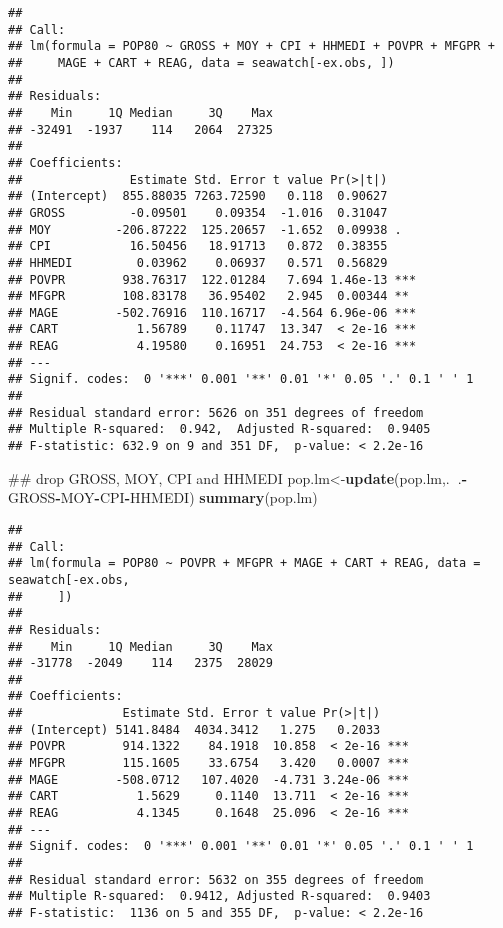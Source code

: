 \documentclass[]{article}
\newenvironment{Shaded}{\begin{snugshade}}{\end{snugshade}}
\newcommand{\KeywordTok}[1]{\textcolor[rgb]{0.13,0.29,0.53}{\textbf{#1}}}
\newcommand{\OperatorTok}[1]{\textcolor[rgb]{0.81,0.36,0.00}{\textbf{#1}}}
\newcommand{\NormalTok}[1]{#1}
\begin{document}
\begin{verbatim}
## 
## Call:
## lm(formula = POP80 ~ GROSS + MOY + CPI + HHMEDI + POVPR + MFGPR + 
##     MAGE + CART + REAG, data = seawatch[-ex.obs, ])
## 
## Residuals:
##    Min     1Q Median     3Q    Max 
## -32491  -1937    114   2064  27325 
## 
## Coefficients:
##               Estimate Std. Error t value Pr(>|t|)    
## (Intercept)  855.88035 7263.72590   0.118  0.90627    
## GROSS         -0.09501    0.09354  -1.016  0.31047    
## MOY         -206.87222  125.20657  -1.652  0.09938 .  
## CPI           16.50456   18.91713   0.872  0.38355    
## HHMEDI         0.03962    0.06937   0.571  0.56829    
## POVPR        938.76317  122.01284   7.694 1.46e-13 ***
## MFGPR        108.83178   36.95402   2.945  0.00344 ** 
## MAGE        -502.76916  110.16717  -4.564 6.96e-06 ***
## CART           1.56789    0.11747  13.347  < 2e-16 ***
## REAG           4.19580    0.16951  24.753  < 2e-16 ***
## ---
## Signif. codes:  0 '***' 0.001 '**' 0.01 '*' 0.05 '.' 0.1 ' ' 1
## 
## Residual standard error: 5626 on 351 degrees of freedom
## Multiple R-squared:  0.942,  Adjusted R-squared:  0.9405 
## F-statistic: 632.9 on 9 and 351 DF,  p-value: < 2.2e-16
\end{verbatim}

\begin{Shaded}
\begin{Highlighting}[]
\NormalTok{## drop GROSS, MOY, CPI and HHMEDI}
\NormalTok{pop.lm<-}\KeywordTok{update}\NormalTok{(pop.lm,.}\OperatorTok{~}\NormalTok{.}\OperatorTok{-}\NormalTok{GROSS}\OperatorTok{-}\NormalTok{MOY}\OperatorTok{-}\NormalTok{CPI}\OperatorTok{-}\NormalTok{HHMEDI)}
\KeywordTok{summary}\NormalTok{(pop.lm)}
\end{Highlighting}
\end{Shaded}

\begin{verbatim}
## 
## Call:
## lm(formula = POP80 ~ POVPR + MFGPR + MAGE + CART + REAG, data = seawatch[-ex.obs, 
##     ])
## 
## Residuals:
##    Min     1Q Median     3Q    Max 
## -31778  -2049    114   2375  28029 
## 
## Coefficients:
##              Estimate Std. Error t value Pr(>|t|)    
## (Intercept) 5141.8484  4034.3412   1.275   0.2033    
## POVPR        914.1322    84.1918  10.858  < 2e-16 ***
## MFGPR        115.1605    33.6754   3.420   0.0007 ***
## MAGE        -508.0712   107.4020  -4.731 3.24e-06 ***
## CART           1.5629     0.1140  13.711  < 2e-16 ***
## REAG           4.1345     0.1648  25.096  < 2e-16 ***
## ---
## Signif. codes:  0 '***' 0.001 '**' 0.01 '*' 0.05 '.' 0.1 ' ' 1
## 
## Residual standard error: 5632 on 355 degrees of freedom
## Multiple R-squared:  0.9412, Adjusted R-squared:  0.9403 
## F-statistic:  1136 on 5 and 355 DF,  p-value: < 2.2e-16
\end{verbatim}
\end{document}
